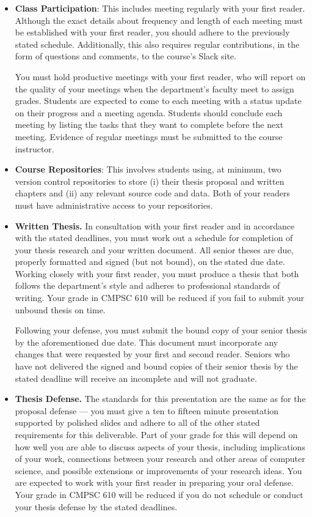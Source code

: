 \begin{itemize}
  \itemsep -.25em

  \item {\bf Class Participation}: This includes meeting regularly with your first reader. Although the exact details
    about frequency and length of each meeting must be established with your first reader, you should adhere to the
    previously stated schedule. Additionally, this also requires regular contributions, in the form of questions and
    comments, to the course's Slack site.

  You must hold productive meetings with your first reader, who will report on the quality of your meetings when the
  department's faculty meet to assign grades.  Students are expected to come to each meeting with a status update on
  their progress and a meeting agenda.  Students should conclude each meeting by listing the tasks that they want to
  complete before the next meeting. Evidence of regular meetings must be submitted to the course instructor.

  \item {\bf Course Repositories}: This involves students using, at minimum, two version control repositories to
    store (i) their thesis proposal and written chapters and (ii) any relevant source code and data.  Both of your
    readers must have administrative access to your repositories.

  \item {\bf Written Thesis.} In consultation with your first reader and in accordance with the stated deadlines, you
    must work out a schedule for completion of your thesis research and your written document. All senior theses are
    due, properly formatted and signed (but not bound), on the stated due date.  Working closely with your first reader,
    you must produce a thesis that both follows the department's style and adheres to professional standards of writing.
    Your grade in CMPSC 610 will be reduced if you fail to submit your unbound thesis on time.

    Following your defense, you must submit the bound copy of your senior thesis by the aforementioned due date.  This
    document must incorporate any changes that were requested by your first and second reader. Seniors who have not
    delivered the signed and bound copies of their senior thesis by the stated deadline will receive an
    incomplete and will not graduate.

  \item{\bf Thesis Defense.} The standards for this presentation are the same as for the proposal defense --- you must
    give a ten to fifteen minute presentation supported by polished slides and adhere to all of the other stated
    requirements for this deliverable.  Part of your grade for this will depend on how well you are able to discuss
    aspects of your thesis, including implications of your work, connections between your research and other areas of
    computer science, and possible extensions or improvements of your research ideas.  You are expected to work with
    your first reader in preparing your oral defense.  Your grade in CMPSC 610 will be reduced if you do not schedule or
    conduct your thesis defense by the stated deadlines.


\end{itemize}
